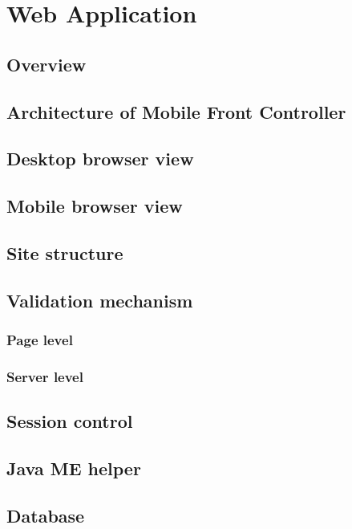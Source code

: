 
\chapter{Web Application}
\label{sec:WebApplication}

\section{Overview}

\section{Architecture of Mobile Front Controller}

\section{Desktop browser view}

\section{Mobile browser view}

\section{Site structure}

\section{Validation mechanism}

\subsection{Page level}

\subsection{Server level}

\section{Session control}

\section{Java ME helper}

\section{Database}

